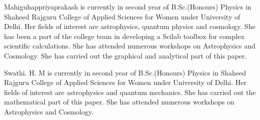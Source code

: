 \documentclass[journal]{IEEEtran}
\begin{document}
\begin{IEEEbiography}{Mahiguhappriyaprakash} is currently in second year of B.Sc.(Honours) Physics in Shaheed Rajguru College of Applied Sciences for Women under University of Delhi. Her fields of interest are astrophysics, quantum physics and cosmology. She has been a part of the college team in developing a Scilab toolbox for complex scientific calculations. She has attended numerous workshops on Astrophysics and Cosmology. She has carried out the graphical and analytical part of this paper.
\end{IEEEbiography}
\begin{IEEEbiography}{Swathi. H. M} is currently in second year of B.Sc.(Honours) Physics in Shaheed Rajguru College of Applied Sciences for Women under University of Delhi. Her fields of interest are astrophysics and quantum mechanics. She has carried out the mathematical part of this paper. She has attended numerous workshops on Astrophysics and Cosmology.
\end{IEEEbiography}
\vfill
\vfill
\vfill
\vfill
\vfill
\vfill
\vfill
\vfill
\vfill
\vfill
\vfill
\vfill
\vfill
\vfill
\vfill
\vfill
\vfill
\vfill
\vfill
\end{document}
